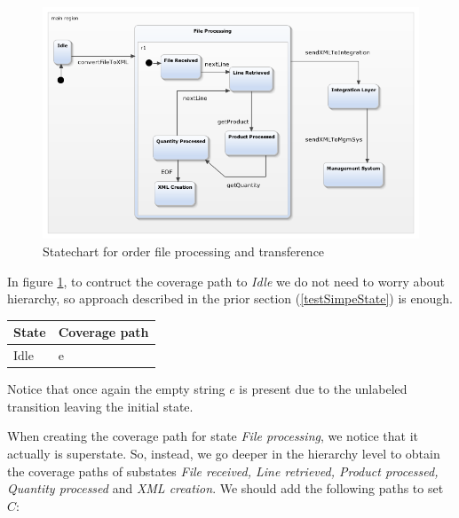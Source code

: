 \begin{figure}[htb]
\centering
\includegraphics[width=15cm]{figuras/webEDI}
\caption{\label{fig:webEDI} Statechart for order file processing and transference}
\end{figure}

In figure \ref{fig:webEDI}, to contruct the coverage path to \textit{Idle} we do not need to worry about hierarchy, so approach described in the prior section (\ref{testSimpeState}) is enough.

\begin{center}
\begin{tabular}{| l | l|}

\hline

State & Coverage path \\ \hline

Idle & e \\

\hline
\end{tabular}
\end{center}

Notice that once again the empty string $e$ is present due to the unlabeled transition leaving the initial state.

When creating the coverage path for state \textit{File processing}, we notice that it actually is superstate. So, instead, we go deeper in the hierarchy level to obtain the coverage paths of substates \textit{File received, Line retrieved, Product processed, Quantity processed} and \textit{XML creation}. We should add the following paths to set $C$:


